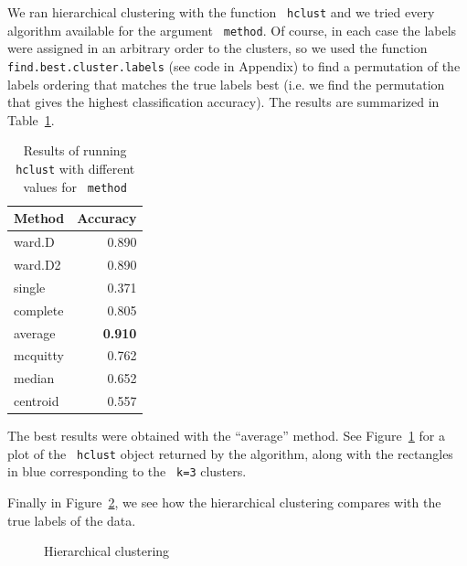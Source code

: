 \documentclass[12pt,article,oneside]{memoir}
\newcommand{\func}[1]{\texttt{\color{red} #1}}
\begin{document}
We ran hierarchical clustering with the function \func{hclust} and we tried every algorithm available for the argument \func{method}. Of course, in each case the labels were assigned in an arbitrary order to the clusters, so we used the function \func{find.best.cluster.labels} (see code in Appendix)  to find a permutation of the labels ordering that matches the true labels best (i.e. we find the permutation that gives the highest classification accuracy). The results are summarized in Table~\ref{table:hclust}.
\begin{table}[ht]
\centering
\begin{tabular}{lr}
  \hline
 Method & Accuracy \\ 
  \hline
 ward.D & 0.890 \\ 
 ward.D2 & 0.890 \\ 
 single & 0.371 \\ 
 complete & 0.805 \\ 
 average & \textbf{0.910} \\ 
 mcquitty & 0.762 \\ 
 median & 0.652 \\ 
 centroid & 0.557 \\ 
   \hline
\end{tabular}
\caption{Results of running \func{hclust} with different values for \func{method}}
\label{table:hclust}
\end{table}
The best results were obtained with the ``average'' method. See Figure~\ref{fig:seeds-hclust-average} for a plot of the \func{hclust} object returned by the algorithm, along with the rectangles in blue corresponding to the \func{k=3} clusters.

\begin{figure}[H]
	\label{fig:seeds-hclust-average}
\end{figure}

Finally in Figure~\ref{fig:seeds-hclust-average-versus}, we see how the hierarchical clustering compares with the true labels of the data.

\begin{figure}[H]
	\caption{Hierarchical clustering}
	\label{fig:seeds-hclust-average-versus}
\end{figure}

\newpage
\end{document}
